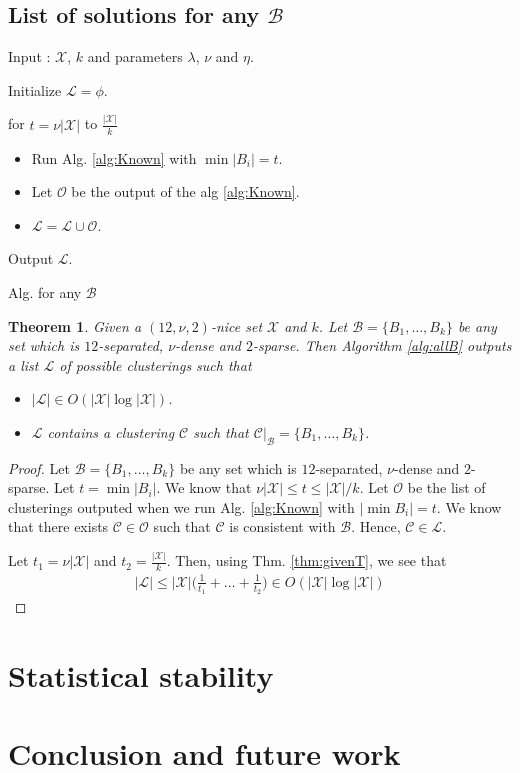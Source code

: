 \documentclass[twoside]{article}
\newcommand{\mc}{\mathcal}
\newtheorem{theorem}{Theorem}
\newenvironment{alg}{
    \begin{list}{}{
        \setlength{\itemsep}{2pt}
        \setlength{\parsep}{0pt}
        \setlength{\parskip}{0pt}
        \setlength{\topsep}{1pt}
    }
}
{
    \end{list}
}
\begin{document}
\subsection{List of solutions for any $\mc B$}

\begin{algorithm}
\begin{alg}
\item[] Input : $\mc X$, $k$ and parameters $\lambda$, $\nu$ and $\eta$.
\item[] Initialize $\mc L = \phi$. 
\item[] for $t = \nu|\mc X|$ to $\frac{|\mc X|}{k}$ 
\begin{itemize}
\item[] Run Alg. \ref{alg:Known} with $\min |B_i| = t$.
\item[] Let $\mc O$ be the output of the alg \ref{alg:Known}.
\item[] $\mc L = \mc L \cup \mc O$.
\end{itemize}
Output $\mc L$.
\label{alg:allB}
\end{alg}
\caption{Alg. for any $\mc B$}
\end{algorithm}

\begin{theorem}
Given a $(12,\nu,2)$-nice set $\mc X$ and $k$. Let $\mc B = \{B_1,\ldots,B_k\}$ be any set which is $12$-separated, $\nu$-dense and $2$-sparse. Then Algorithm \ref{alg:allB} outputs a list $\mc L$ of possible clusterings such that
\begin{itemize}[nolistsep, noitemsep]
\item $|\mc L| \in O(|\mc X|\log |\mc X|)$. 
\item $\mc L$ contains a clustering $\mc C$ such that $\mc C|_{\mc B} = \{B_1,\ldots,B_k\}$.
\end{itemize}
\end{theorem}

\begin{proof}
Let $\mc B = \{B_1,\ldots,B_k\}$ be any set which is $12$-separated, $\nu$-dense and $2$-sparse. Let $t = \min |B_i|$. We know that $\nu |\mc X| \le t \le |\mc X|/k$. Let $\mc O$ be the list of clusterings outputed when we run Alg. \ref{alg:Known} with $|\min B_i| = t$. We know that there exists $\mc C \in \mc O$ such that $\mc C$ is consistent with $\mc B$. Hence, $\mc C \in \mc L$.

Let $t_1 = \nu |\mc X|$ and $t_2 = \frac{|\mc X|}{k}$. Then, using Thm. \ref{thm:givenT}, we see that 
\begin{align*}
	|\mc L| \le |\mc X|\Big(\frac{1}{t_1}+\ldots+\frac{1}{t_2}\Big) \in O(|\mc X|\log |\mc X|)
\end{align*}
\end{proof}

\section{Statistical stability}

\section{Conclusion and future work}


 


\end{document}
